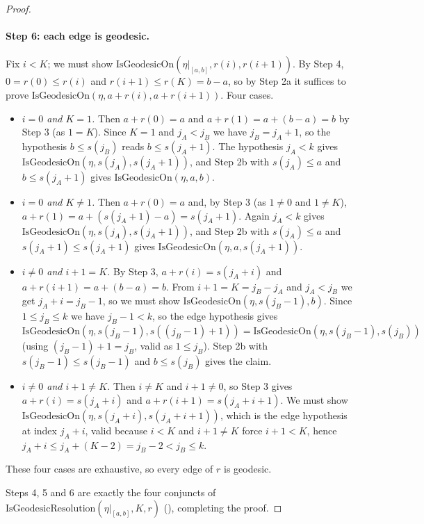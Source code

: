 \begin{proof}
  \paragraph{Step 6: each edge is geodesic.} Fix $i<K$; we must show
  $\mathrm{IsGeodesicOn}(\eta|_{[a,b]},r(i),r(i+1))$. By Step 4, $0 = r(0) \le r(i)$ and $r(i+1)
  \le r(K) = b-a$, so by Step 2a it suffices to prove
  $\mathrm{IsGeodesicOn}(\eta,a+r(i),a+r(i+1))$. Four cases.
  \begin{itemize}
    \item \emph{$i=0$ and $K=1$.} Then $a+r(0)=a$ and $a+r(1)=a+(b-a)=b$ by Step 3 (as $1=K$).
      Since $K=1$ and $j_A<j_B$ we have $j_B=j_A+1$, so the hypothesis $b \le s(j_B)$ reads $b \le
      s(j_A+1)$. The hypothesis $j_A<k$ gives $\mathrm{IsGeodesicOn}(\eta,s(j_A),s(j_A+1))$, and
      Step 2b with $s(j_A) \le a$ and $b \le s(j_A+1)$ gives $\mathrm{IsGeodesicOn}(\eta,a,b)$.
    \item \emph{$i=0$ and $K \ne 1$.} Then $a+r(0)=a$ and, by Step 3 (as $1 \ne 0$ and $1 \ne K$),
      $a+r(1) = a + (s(j_A+1)-a) = s(j_A+1)$. Again $j_A<k$ gives
      $\mathrm{IsGeodesicOn}(\eta,s(j_A),s(j_A+1))$, and Step 2b with $s(j_A) \le a$ and
      $s(j_A+1) \le s(j_A+1)$ gives $\mathrm{IsGeodesicOn}(\eta,a,s(j_A+1))$.
    \item \emph{$i \ne 0$ and $i+1=K$.} By Step 3, $a+r(i) = s(j_A+i)$ and $a+r(i+1) = a+(b-a) =
      b$. From $i+1=K=j_B-j_A$ and $j_A<j_B$ we get $j_A+i = j_B-1$, so we must show
      $\mathrm{IsGeodesicOn}(\eta,s(j_B-1),b)$. Since $1 \le j_B \le k$ we have $j_B-1<k$, so the
      edge hypothesis gives $\mathrm{IsGeodesicOn}(\eta,s(j_B-1),s((j_B-1)+1)) =
      \mathrm{IsGeodesicOn}(\eta,s(j_B-1),s(j_B))$ (using $(j_B-1)+1=j_B$, valid as $1 \le j_B$).
      Step 2b with $s(j_B-1) \le s(j_B-1)$ and $b \le s(j_B)$ gives the claim.
    \item \emph{$i \ne 0$ and $i+1 \ne K$.} Then $i \ne K$ and $i+1 \ne 0$, so Step 3 gives
      $a+r(i) = s(j_A+i)$ and $a+r(i+1) = s(j_A+i+1)$. We must show
      $\mathrm{IsGeodesicOn}(\eta,s(j_A+i),s(j_A+i+1))$, which is the edge hypothesis at index
      $j_A+i$, valid because $i<K$ and $i+1 \ne K$ force $i+1 < K$, hence $j_A+i \le j_A + (K-2) =
      j_B-2 < j_B \le k$.
  \end{itemize}
  These four cases are exhaustive, so every edge of $r$ is geodesic.

  Steps 4, 5 and 6 are exactly the four conjuncts of
  $\mathrm{IsGeodesicResolution}(\eta|_{[a,b]},K,r)$ (), completing
  the proof.
\end{proof}
